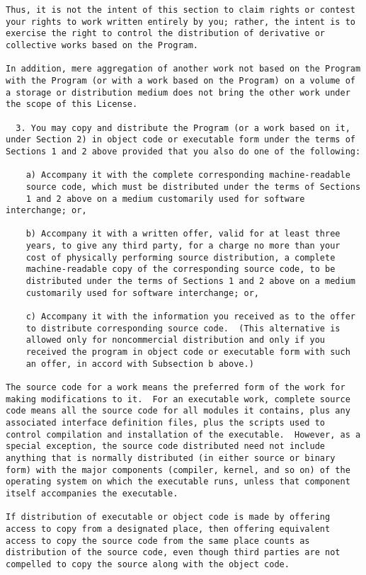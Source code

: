 \documentclass{article}
\begin{document}
\begin{appendix}
\begin{verbatim}
Thus, it is not the intent of this section to claim rights or contest
your rights to work written entirely by you; rather, the intent is to
exercise the right to control the distribution of derivative or
collective works based on the Program.

In addition, mere aggregation of another work not based on the Program
with the Program (or with a work based on the Program) on a volume of
a storage or distribution medium does not bring the other work under
the scope of this License.

  3. You may copy and distribute the Program (or a work based on it,
under Section 2) in object code or executable form under the terms of
Sections 1 and 2 above provided that you also do one of the following:

    a) Accompany it with the complete corresponding machine-readable
    source code, which must be distributed under the terms of Sections
    1 and 2 above on a medium customarily used for software interchange; or,

    b) Accompany it with a written offer, valid for at least three
    years, to give any third party, for a charge no more than your
    cost of physically performing source distribution, a complete
    machine-readable copy of the corresponding source code, to be
    distributed under the terms of Sections 1 and 2 above on a medium
    customarily used for software interchange; or,

    c) Accompany it with the information you received as to the offer
    to distribute corresponding source code.  (This alternative is
    allowed only for noncommercial distribution and only if you
    received the program in object code or executable form with such
    an offer, in accord with Subsection b above.)

The source code for a work means the preferred form of the work for
making modifications to it.  For an executable work, complete source
code means all the source code for all modules it contains, plus any
associated interface definition files, plus the scripts used to
control compilation and installation of the executable.  However, as a
special exception, the source code distributed need not include
anything that is normally distributed (in either source or binary
form) with the major components (compiler, kernel, and so on) of the
operating system on which the executable runs, unless that component
itself accompanies the executable.

If distribution of executable or object code is made by offering
access to copy from a designated place, then offering equivalent
access to copy the source code from the same place counts as
distribution of the source code, even though third parties are not
compelled to copy the source along with the object code.


\end{verbatim}
\end{appendix}
\end{document}
